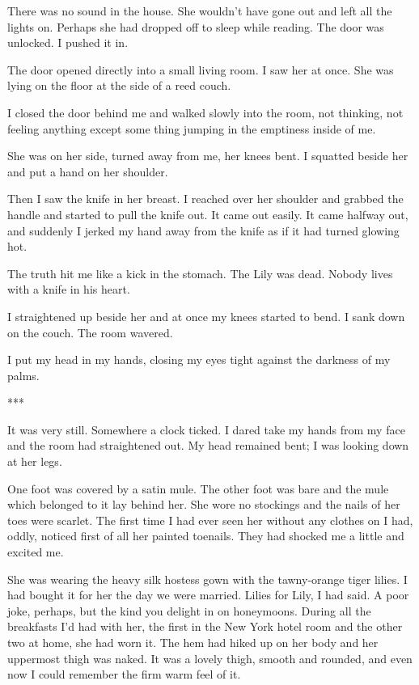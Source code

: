 {There was no sound in the house. She wouldn’t have gone out and left all the lights on. Perhaps she had dropped off to sleep while reading. The door was unlocked. I pushed it in.

The door opened directly into a small living room. I saw her at once. She was lying on the floor at the side of a reed couch.

I closed the door behind me and walked slowly into the room, not thinking, not feeling anything except some thing jumping in the emptiness inside of me.

She was on her side, turned away from me, her knees bent. I squatted beside her and put a hand on her shoulder.

Then I saw the knife in her breast. I reached over her shoulder and grabbed the handle and started to pull the knife out. It came out easily. It came halfway out, and suddenly I jerked my hand away from the knife as if it had turned glowing hot.

The truth hit me like a kick in the stomach. The Lily was dead. Nobody lives with a knife in his heart.

I straightened up beside her and at once my knees started to bend. I sank down on the couch. The room wavered.

I put my head in my hands, closing my eyes tight against the darkness of my palms.

***

It was very still. Somewhere a clock ticked. I dared take my hands from my face and the room had straightened out. My head remained bent; I was looking down at her legs.

One foot was covered by a satin mule. The other foot was bare and the mule which belonged to it lay behind her. She wore no stockings and the nails of her toes were scarlet. The first time I had ever seen her without any clothes on I had, oddly, noticed first of all her painted toenails. They had shocked me a little and excited me.

She was wearing the heavy silk hostess gown with the tawny-orange tiger lilies. I had bought it for her the day we were married. Lilies for Lily, I had said. A poor joke, perhaps, but the kind you delight in on honeymoons. During all the breakfasts I’d had with her, the first in the New York hotel room and the other two at home, she had worn it. The hem had hiked up on her body and her uppermost thigh was naked. It was a lovely thigh, smooth and rounded, and even now I could remember the firm warm feel of it.

}
